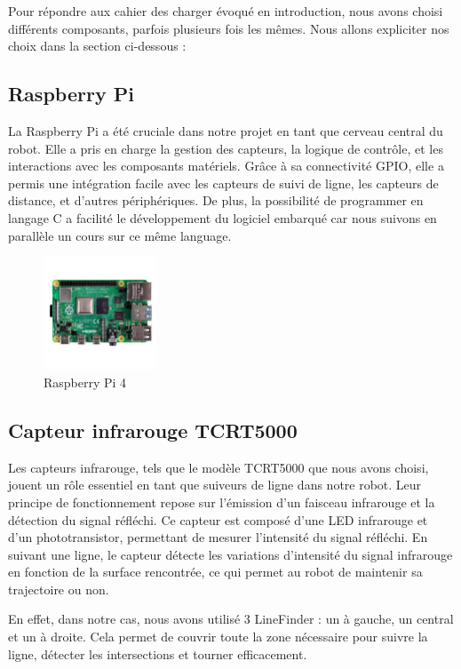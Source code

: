 Pour répondre aux cahier des charger évoqué en introduction, nous avons choisi différents composants, parfois plusieurs fois les mêmes. Nous allons expliciter nos choix dans la section ci-dessous :

\subsection{Raspberry Pi}
La Raspberry Pi a été cruciale dans notre projet en tant que cerveau central du robot. Elle a pris en charge la gestion des capteurs, la logique de contrôle, et les interactions avec les composants matériels. Grâce à sa connectivité GPIO, elle a permis une intégration facile avec les capteurs de suivi de ligne, les capteurs de distance, et d'autres périphériques. De plus, la possibilité de programmer en langage C a facilité le développement du logiciel embarqué car nous suivons en parallèle un cours sur ce même language.

\begin{figure}[h]
    \centering
    \includegraphics[width=0.3\textwidth]{images/components/RPi4.jpg}
    \caption{Raspberry Pi 4}
    \label{fig:Raspberry Pi 4}
\end{figure}

\subsection{Capteur infrarouge TCRT5000}
Les capteurs infrarouge, tels que le modèle TCRT5000 que nous avons choisi, jouent un rôle essentiel en tant que suiveurs de ligne dans notre robot. Leur principe de fonctionnement repose sur l'émission d'un faisceau infrarouge et la détection du signal réfléchi. Ce capteur est composé d'une LED infrarouge et d'un phototransistor, permettant de mesurer l'intensité du signal réfléchi. En suivant une ligne, le capteur détecte les variations d'intensité du signal infrarouge en fonction de la surface rencontrée, ce qui permet au robot de maintenir sa trajectoire ou non.

En effet, dans notre cas, nous avons utilisé 3 LineFinder : un à gauche, un central et un à droite. Cela permet de couvrir toute la zone nécessaire pour suivre la ligne, détecter les intersections et tourner efficacement.


